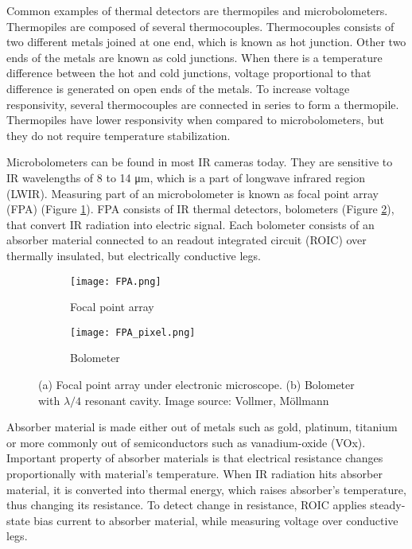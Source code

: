Common examples of thermal detectors are thermopiles and microbolometers. 
Thermopiles are composed of several thermocouples.
Thermocouples consists of two different metals joined at one end, which is known as hot junction.
Other two ends of the metals are known as cold junctions.
When there is a temperature difference between the hot and cold junctions, voltage proportional to that difference is generated on open ends of the metals.
To increase voltage responsivity, several thermocouples are connected in series to form a thermopile\cite{thermal_book}.
Thermopiles have lower responsivity when compared to microbolometers, but they do not require temperature stabilization\cite{thermal_book}.

Microbolometers can be found in most IR cameras today\cite{thermal_book}. 
They are sensitive to IR wavelengths of 8 to 14 \si{\micro\meter}, which is a part of longwave infrared region (LWIR)\cite{thermal_book}.
Measuring part of an microbolometer is known as focal point array (FPA) (Figure \ref{FPA}).
FPA consists of IR thermal detectors, bolometers (Figure \ref{FPA_pixel}), that convert IR radiation into electric signal.
Each bolometer consists of an absorber material connected to an readout integrated circuit (ROIC) over thermally insulated, but electrically conductive legs\cite{thermal_article}.
\newline

\begin{figure}[h]
    \begin{subfigure}{0.5\textwidth}
        \centering
        \texttt{[image: FPA.png]} 
        \caption{Focal point array}
        \label{FPA}
    \end{subfigure}
    \begin{subfigure}{0.5\textwidth}
        \centering
        \texttt{[image: FPA\_pixel.png]}
        \caption{Bolometer}
        \label{FPA_pixel}
    \end{subfigure}

    \caption{(a) Focal point array under electronic microscope. (b) Bolometer with $\lambda /4$ resonant cavity. Image source: Vollmer, Möllmann\cite{thermal_book}}
    \label{FPA_microbolo}
\end{figure}

Absorber material is made either out of metals such as gold, platinum, titanium or more commonly out of semiconductors such as vanadium-oxide (VOx)\cite{thermal_article}.
Important property of absorber materials is that electrical resistance changes proportionally with material's temperature\cite{thermal_book}.
When IR radiation hits absorber material, it is converted into thermal energy, which raises absorber's temperature, thus changing its resistance.
To detect change in resistance, ROIC applies steady-state bias current to absorber material, while measuring voltage over conductive legs\cite{thermal_book}. 

